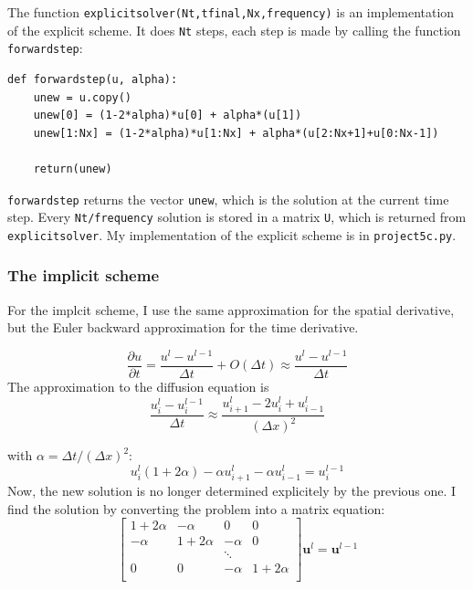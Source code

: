 \documentclass{article}
\begin{document}
The function \texttt{explicitsolver(Nt,tfinal,Nx,frequency)} is an implementation of the explicit scheme. It does \texttt{Nt} steps, each step is made by calling the function \texttt{forwardstep}:
\begin{verbatim}
def forwardstep(u, alpha): 
    unew = u.copy()
    unew[0] = (1-2*alpha)*u[0] + alpha*(u[1]) 
    unew[1:Nx] = (1-2*alpha)*u[1:Nx] + alpha*(u[2:Nx+1]+u[0:Nx-1])
	
	return(unew)
\end{verbatim}
\texttt{forwardstep} returns the vector \texttt{unew}, which is the solution at the current time step. Every \texttt{Nt/frequency} solution is stored in a matrix \texttt{U}, which is returned from  \texttt{explicitsolver}. 
My implementation of the explicit scheme is in \texttt{project5c.py}.
\subsubsection{The implicit scheme}
For the implcit scheme, I use the same approximation for the spatial derivative, but the Euler backward approximation for the time derivative.

\begin{equation*}
\frac{\partial u}{\partial t} = \frac{u^l-u^{l-1}}{\Delta t}+ O(\Delta t) \approx \frac{u^l-u^{l-1}}{\Delta t}
\end{equation*}
The approximation to the diffusion equation is
\begin{equation*}
\frac{u_{i}^l-u_{i}^{l-1}}{\Delta t} \approx \frac{u_{i+1}^l-2u_i^l + u_{i-1}^l}{(\Delta x)^2}
\end{equation*}

with $\alpha = \Delta t/ (\Delta x)^2$:
\begin{equation*}
u_{i}^l(1+2\alpha) -\alpha u_{i+1}^l-\alpha u_{i-1}^l=u_i^{l-1}
\end{equation*}
Now, the new solution is no longer determined explicitely by the previous one. I find the solution by converting the problem into a matrix equation:
\begin{equation}
\begin{bmatrix}
1+2\alpha & -\alpha & 0 & 0 \\
-\alpha & 1+2\alpha & -\alpha & 0 \\
 &  & \ddots  &  \\
0 & 0 & -\alpha & 1+2\alpha \\
\end{bmatrix}
\bm{u}^l
=
\bm{u}^{l-1}
\end{equation}
\end{document}
